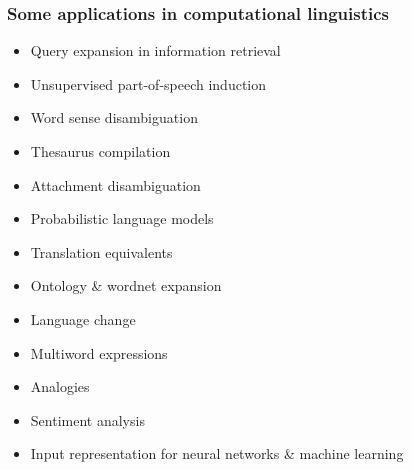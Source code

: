 \documentclass[t]{beamer} %
\begin{document}
\begin{frame}
  \frametitle{Some applications in computational linguistics}

  \ungap[1.5]
  \begin{itemize}
  \item Query expansion in information retrieval \citep{Grefenstette:94}
  \item Unsupervised part-of-speech induction \citep{Schuetze:95}
  \item Word sense disambiguation \citep{Schuetze:98,Rapp:04b}
  \item Thesaurus compilation \citep{Lin:98b,Rapp:04a}
  \item Attachment disambiguation \citep*{Pantel:Lin:00}
  \item Probabilistic language models \citep{Bengio:etc:03b}
  \item Translation equivalents \citep{Sahlgren:Karlgren:05}
  \item Ontology \& wordnet expansion \citep{Pantel:etc:09}
  \item Language change \citep{Sagi:Kaufmann:Clark:09,Hamilton:Leskovec:Jurafsky:16}
  \item Multiword expressions \citep{Kiela:Clark:13}
  \item Analogies \citep{Turney:13,Gladkova:Drozd:Matsuoka:16}
  \item Sentiment analysis \citep{Rothe:Schuetze:16,Yu:etc:17}
  \item[\hand] Input representation for neural networks \& machine learning
  \end{itemize}
\end{frame}
\end{document}
